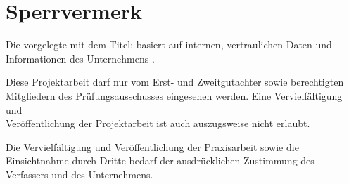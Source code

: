\chapter{Sperrvermerk}

Die vorgelegte \worktitle mit dem Titel: \emph{\grqq{}\Title\grqq{}}
basiert auf internen, vertraulichen Daten und Informationen des Unternehmens \myCompany.

Diese Projektarbeit darf nur vom Erst- und Zweitgutachter sowie berechtigten Mitgliedern des Prüfungsausschusses eingesehen werden. Eine Vervielfältigung und \\Veröffentlichung der Projektarbeit ist auch auszugsweise nicht erlaubt.

Die Vervielfältigung und Veröffentlichung der Praxisarbeit  sowie die Einsichtnahme durch Dritte bedarf der ausdrücklichen Zustimmung des Verfassers und des Unternehmens.
